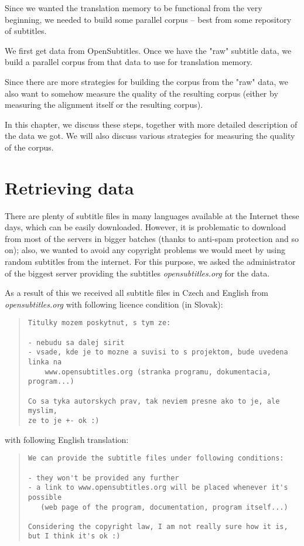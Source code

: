 Since we wanted the translation memory to be functional from the very beginning, we needed to build some parallel corpus -- best from some repository of subtitles. 

We first get data from OpenSubtitles. Once we have the "raw" subtitle data, we build a parallel corpus from that data to use for translation memory. 

Since there are more strategies for building the corpus from the "raw" data, we also want to somehow measure the quality of the resulting corpus (either by measuring the alignment itself or the resulting corpus).

In this chapter, we discuss these steps, together with more detailed description of the data we got. We will also discuss various strategies for measuring the quality of the corpus.


\section{Retrieving data}

There are plenty of subtitle files in many languages available at the Internet these days, which can be easily downloaded.
However, it is problematic to download from most of the servers in bigger batches (thanks to anti-spam protection and so on); also, we wanted to avoid any copyright problems we would meet by using random subtitles from the internet. For this purpose, we asked the administrator of the biggest server providing the subtitles \emph{opensubtitles.org} for the data.

As a result of this we received all subtitle files in Czech and English from \emph{opensubtitles.org} with following licence condition (in Slovak):

\begin{quote}
\begin{verbatim}
Titulky mozem poskytnut, s tym ze:

- nebudu sa dalej sirit
- vsade, kde je to mozne a suvisi to s projektom, bude uvedena linka na
    www.opensubtitles.org (stranka programu, dokumentacia, program...)

Co sa tyka autorskych prav, tak neviem presne ako to je, ale myslim,
ze to je +- ok :)
\end{verbatim}
\end{quote}

\noindent with following English translation:

\begin{quote}
\begin{verbatim}
We can provide the subtitle files under following conditions:

- they won't be provided any further
- a link to www.opensubtitles.org will be placed whenever it's possible 
   (web page of the program, documentation, program itself...)

Considering the copyright law, I am not really sure how it is, 
but I think it's ok :)
\end{verbatim}
\end{quote}


